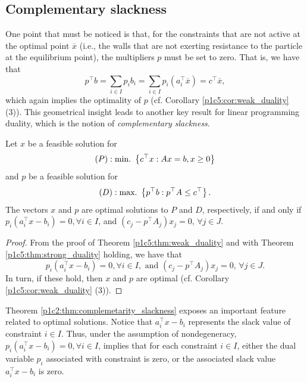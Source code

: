 \subsection{Complementary slackness}

One point that must be noticed is that, for the constraints that are not active at the optimal point $\overline{x}$ (i.e., the walls that are not exerting resistance to the particle at the equilibrium point), the multipliers $p$ must be set to zero. That is, we have that
%
\begin{equation*}
	p^\top b  = \sum_{i \in I} p_ib_i = \sum_{i \in I} p_i(a_i^\top\overline{x}) = c^\top \overline{x},	
\end{equation*}
%
which again implies the optimality of $p$ (cf. Corollary \ref{p1c5:cor:weak_duality} (3)). This geometrical insight leads to another key result for linear programming duality, which is the notion of \emph{complementary slackness}.

\begin{theorem}\label{p1c2:thm:complemetarity_slackness}
	Let $x$ be a feasible solution for 
	\begin{equation*}
		(P) : \mathop{\text{min.~}}\left\{ c^\top x : Ax = b, x \geq 0 \right \}	
	\end{equation*}
	and $p$ be a feasible solution for 
	\begin{equation*}
		(D) : \mathop{\text{max.~}}\left\{ p^\top b : p^\top A \leq c^\top \right \}. 	
	\end{equation*}
	The vectors $x$ and $p$ are optimal solutions to $P$ and $D$, respectively, if and only if
	$p_i(a_i^\top x - b_i) = 0, \forall i \in I$, and $(c_j - p^\top A_j)x_j = 0, \, \forall j \in J$. 
\end{theorem}

\begin{proof} 
	From the proof of Theorem \ref{p1c5:thm:weak_duality} and with Theorem \ref{p1c5:thm:strong_duality} holding, we have that 
%
	\begin{equation*}
		p_i(a_i^\top x - b_i) = 0, \forall i \in I, \text{ and } 	
	(c_j - p^\top A_j)x_j = 0, \, \forall j \in J.
	\end{equation*}
%
	In turn, if these hold, then $x$ and $p$ are optimal (cf. Corollary \ref{p1c5:cor:weak_duality} (3)). 
\end{proof}

Theorem \ref{p1c2:thm:complemetarity_slackness} exposes an important feature related to optimal solutions. Notice that $a_i^\top x - b_i$ represents the slack value of constraint $i \in I$. Thus, under the assumption of nondegeneracy, $p_i(a_i^\top x - b_i) = 0, \forall i \in I$, implies that for each constraint $i \in I$, either the dual variable $p_i$ associated with constraint is zero, or the associated slack value $a_i^\top x - b_i$ is zero. 


